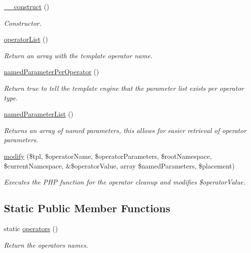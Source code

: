 \begin{DoxyCompactItemize}
\item 
\hyperlink{classextension_1_1ezextrafeatures_1_1autoloads_1_1e_z_extra_features_template_operators_a45d131aea3395abe80b7ebc1cca3443a}{\-\_\-\-\_\-construct} ()
\begin{DoxyCompactList}\small\item\em Constructor. \end{DoxyCompactList}\item 
\hyperlink{classextension_1_1ezextrafeatures_1_1autoloads_1_1e_z_extra_features_template_operators_ae8b384b42ad54ada3d9bd5430675deb0}{operator\-List} ()
\begin{DoxyCompactList}\small\item\em Return an array with the template operator name. \end{DoxyCompactList}\item 
\hyperlink{classextension_1_1ezextrafeatures_1_1autoloads_1_1e_z_extra_features_template_operators_aa0bb322661f1d8bb888da1698cb5875a}{named\-Parameter\-Per\-Operator} ()
\begin{DoxyCompactList}\small\item\em Return true to tell the template engine that the parameter list exists per operator type. \end{DoxyCompactList}\item 
\hyperlink{classextension_1_1ezextrafeatures_1_1autoloads_1_1e_z_extra_features_template_operators_aa5f586697dbb2fd17553dd0d365002cc}{named\-Parameter\-List} ()
\begin{DoxyCompactList}\small\item\em Returns an array of named parameters, this allows for easier retrieval of operator parameters. \end{DoxyCompactList}\item 
\hyperlink{classextension_1_1ezextrafeatures_1_1autoloads_1_1e_z_extra_features_template_operators_a09877cf65a186fa2acc588c6f465e221}{modify} (\$tpl, \$operator\-Name, \$operator\-Parameters, \$root\-Namespace, \$current\-Namespace, \&\$operator\-Value, array \$named\-Parameters, \$placement)
\begin{DoxyCompactList}\small\item\em Executes the P\-H\-P function for the operator cleanup and modifies {\itshape \$operator\-Value\/}. \end{DoxyCompactList}\end{DoxyCompactItemize}
\subsection*{Static Public Member Functions}
\begin{DoxyCompactItemize}
\item 
static \hyperlink{classextension_1_1ezextrafeatures_1_1autoloads_1_1e_z_extra_features_template_operators_a84f0b5bd7a183452b3a195f17bf4c878}{operators} ()
\begin{DoxyCompactList}\small\item\em Return the operators names. \end{DoxyCompactList}\end{DoxyCompactItemize}
